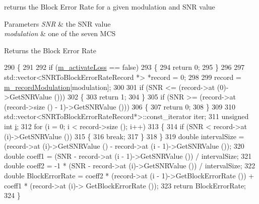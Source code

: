 returns the Block Error Rate for a given modulation and S\+NR value 


\begin{DoxyParams}{Parameters}
{\em S\+NR} & the S\+NR value \\
\hline
{\em modulation} & one of the seven M\+CS \\
\hline
\end{DoxyParams}
\begin{DoxyReturn}{Returns}
the Block Error Rate 
\end{DoxyReturn}

\begin{DoxyCode}
290 \{
291 
292   \textcolor{keywordflow}{if} (\hyperlink{classns3_1_1SNRToBlockErrorRateManager_ac12a64ac423a9051a6f2cebf82fb3259}{m\_activateLoss} == \textcolor{keyword}{false})
293     \{
294       \textcolor{keywordflow}{return} 0;
295     \}
296 
297   std::vector<SNRToBlockErrorRateRecord *> *record = 0;
298 
299   record = \hyperlink{classns3_1_1SNRToBlockErrorRateManager_af74c812f3b0a25252f2897aadea6898e}{m\_recordModulation}[modulation];
300 
301   \textcolor{keywordflow}{if} (SNR <= (record->at (0)->GetSNRValue ()))
302     \{
303       \textcolor{keywordflow}{return} 1;
304     \}
305   \textcolor{keywordflow}{if} (SNR >= (record->at (record->size () - 1)->GetSNRValue ()))
306     \{
307       \textcolor{keywordflow}{return} 0;
308     \}
309 
310   std::vector<SNRToBlockErrorRateRecord*>::const\_iterator iter;
311   \textcolor{keywordtype}{unsigned} \textcolor{keywordtype}{int} \hyperlink{bernuolliDistribution_8m_a6f6ccfcf58b31cb6412107d9d5281426}{i};
312   \textcolor{keywordflow}{for} (i = 0; i < record->size (); i++)
313     \{
314       \textcolor{keywordflow}{if} (SNR < record->at (i)->GetSNRValue ())
315         \{
316           \textcolor{keywordflow}{break};
317         \}
318     \}
319   \textcolor{keywordtype}{double} intervalSize = (record->at (i)->GetSNRValue () - record->at (i - 1)->GetSNRValue ());
320   \textcolor{keywordtype}{double} coeff1 = (SNR - record->at (i - 1)->GetSNRValue ()) / intervalSize;
321   \textcolor{keywordtype}{double} coeff2 = -1 * (SNR - record->at (i)->GetSNRValue ()) / intervalSize;
322   \textcolor{keywordtype}{double} BlockErrorRate = coeff2 * (record->at (i - 1)->GetBlockErrorRate ()) + coeff1 * (record->at (i)->
      GetBlockErrorRate ());
323   \textcolor{keywordflow}{return} BlockErrorRate;
324 \}
\end{DoxyCode}
